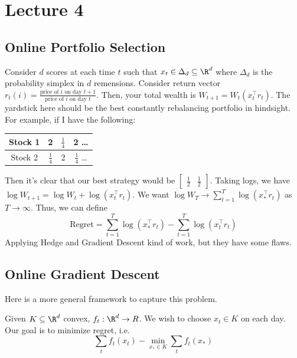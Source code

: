 \section{Lecture 4}

\subsection{Online Portfolio Selection}
Consider $d$ scores at each time $t$
such that $x_{t} \in \Delta_d \subseteq \R^d$
where $\Delta_d$ is the probability simplex in $d$ remensions.
Consider return vector $r_t(i) = \frac{\text{price of } i \text{ on day } t + 1}{\text{price of } i \text{ on day } t}$.
Then, your
total wealth is $W_{t + 1} = W_t (x_t^{\top} r_t)$.
The yardstick here should be the best constantly rebalancing portfolio in hindsight.
For example,
if I have the following:
\begin{center}
\begin{tabular}{c | c  c  c}
    Stock 1 & 2 & $\frac14$ & 2 \dots \\ \hline
    Stock 2 & $\frac14$ & 2 & $\frac14$ \dots
\end{tabular}
\end{center}
Then it's clear that our best strategy
would be $\begin{bmatrix} \frac{1}{2} & \frac{1}{2}
\end{bmatrix}$. Taking logs, we have $\log W_{t + 1} = \log W_t + \log(x_t^{\top} r_t)$.
We want $\log W_T \to \sum_{t = 1}^T \log(x_*^{\top} r_t)$ as $T \to \infty$.
Thus, we can define
\[ \text{Regret} = \sum_{t = 1}^{T} \log(x_*^{\top} r_t) - \sum_{t = 1}^T \log(x_t^{\top} r_t) \]
Applying Hedge and Gradient Descent kind of work, but they have some flaws.

\subsection{Online Gradient Descent}
Here is a more general framework to capture this problem.
\begin{definition}
    Given $K \subseteq \R^d$ convex, $f_t: \R^d \to R$. We wish to choose
    $x_t \in K$ on each day. Our goal is to minimize regret, i.e.
    \[ \sum_t f_t(x_t) - \min_{x_* \in K} \sum_t f_t(x_*) \]
\end{definition}

